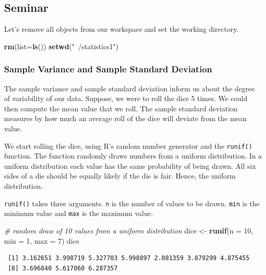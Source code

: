 \documentclass[]{article}
\newenvironment{Shaded}{\begin{snugshade}}{\end{snugshade}}
\newcommand{\KeywordTok}[1]{\textcolor[rgb]{0.13,0.29,0.53}{\textbf{#1}}}
\newcommand{\DataTypeTok}[1]{\textcolor[rgb]{0.13,0.29,0.53}{#1}}
\newcommand{\DecValTok}[1]{\textcolor[rgb]{0.00,0.00,0.81}{#1}}
\newcommand{\StringTok}[1]{\textcolor[rgb]{0.31,0.60,0.02}{#1}}
\newcommand{\CommentTok}[1]{\textcolor[rgb]{0.56,0.35,0.01}{\textit{#1}}}
\newcommand{\NormalTok}[1]{#1}
\theoremstyle{definition}
\theoremstyle{definition}
\theoremstyle{definition}
\theoremstyle{remark}
\begin{document}
\subsection{Seminar}\label{seminar-4}

Let's remove all objects from our workspace and set the working
directory.

\begin{Shaded}
\begin{Highlighting}[]
\KeywordTok{rm}\NormalTok{(}\DataTypeTok{list=}\KeywordTok{ls}\NormalTok{())}
\KeywordTok{setwd}\NormalTok{(}\StringTok{"~/statistics1"}\NormalTok{)}
\end{Highlighting}
\end{Shaded}

\subsubsection{Sample Variance and Sample Standard
Deviation}\label{sample-variance-and-sample-standard-deviation}

The sample variance and sample standard deviation inform us about the
degree of variability of our data. Suppose, we were to roll the dice 5
times. We could then compute the mean value that we roll. The sample
standard deviation measures by how much an average roll of the dice will
deviate from the mean value.

We start rolling the dice, using R's random number generator and the
\texttt{runif()} function. The function randomly draws numbers from a
uniform distribution. In a uniform distribution each value has the same
probability of being drawn. All six sides of a die should be equally
likely if the die is fair. Hence, the uniform distribution.

\texttt{runif()} takes three arguments. \texttt{n} is the number of
values to be drawn. \texttt{min} is the minimum value and \texttt{max}
is the maximum value.

\begin{Shaded}
\begin{Highlighting}[]
\CommentTok{# random draw of 10 values from a uniform distribution}
\NormalTok{dice <-}\StringTok{ }\KeywordTok{runif}\NormalTok{(}\DataTypeTok{n =} \DecValTok{10}\NormalTok{, }\DataTypeTok{min =} \DecValTok{1}\NormalTok{, }\DataTypeTok{max =} \DecValTok{7}\NormalTok{)}
\NormalTok{dice}
\end{Highlighting}
\end{Shaded}

\begin{verbatim}
 [1] 3.162651 3.998719 5.327703 5.998897 2.081359 3.879299 4.875455
 [8] 3.696840 5.617060 6.287357
\end{verbatim}
\end{document}
